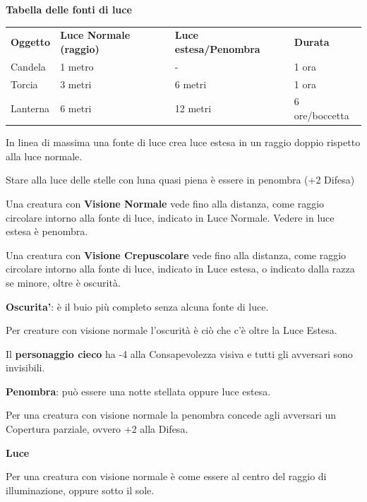 \documentclass[a4paper,11pt,twoside,openany]{book}
\begin{document}
\medskip

\textbf{Tabella delle fonti di luce}

\medskip


\begin{tabular}{llll}
	\toprule
	\textbf{Oggetto} & \textbf{Luce Normale (raggio)} & \textbf{Luce estesa/Penombra} & \textbf{Durata}\\
	Candela          & 1 metro         & -              & 1 ora\\
	Torcia           & 3 metri         & 6 metri        & 1 ora\\
	Lanterna         & 6 metri         & 12 metri       & 6 ore/boccetta\\
\end{tabular}

\bigskip

In linea di massima una fonte di luce crea luce estesa in un raggio doppio rispetto alla luce normale.

Stare alla luce delle stelle con luna quasi piena è essere in penombra (+2 Difesa)

Una creatura con \textbf{Visione Normale} vede fino alla distanza, come raggio circolare intorno alla fonte di luce, indicato in Luce Normale. Vedere in luce estesa è penombra.

Una creatura con \textbf{Visione Crepuscolare} vede fino alla distanza, come raggio circolare intorno alla fonte di luce, indicato in Luce estesa, o indicato dalla razza se minore, oltre è oscurità.

\textbf{Oscurita'}: è il buio più completo senza alcuna fonte di luce.

Per creature con visione normale l'oscurità è ciò che c'è oltre la Luce Estesa.

Il \textbf{personaggio cieco} ha -4 alla Consapevolezza visiva e tutti gli avversari sono invisibili.

\textbf{Penombra}: può essere una notte stellata oppure luce estesa.

Per una creatura con visione normale la penombra concede agli avversari un Copertura parziale, ovvero +2 alla Difesa.

\textbf{Luce}

Per una creatura con visione normale è come essere al centro del raggio di illuminazione, oppure sotto il sole.
\end{document}
